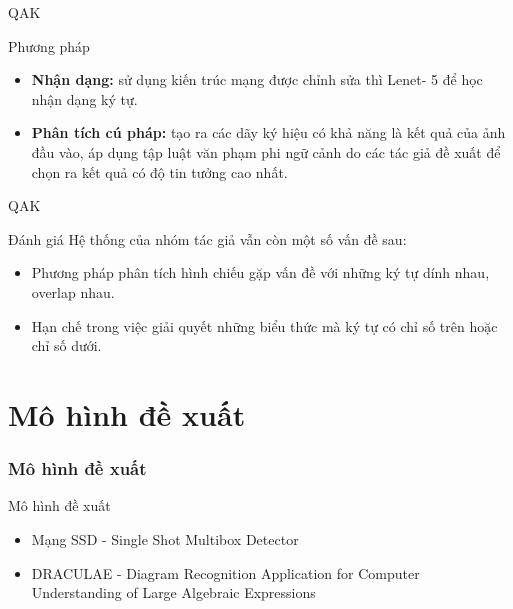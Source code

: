 \documentclass{beamer}
\begin{document}
	\begin{frame}{QAK}
		\begin{block}{Phương pháp}
			\begin{itemize}
				\item \textbf{Nhận dạng:} sử dụng kiến trúc mạng được chỉnh sửa thì Lenet- 5 để học nhận dạng ký tự.
				\item \textbf{Phân tích cú pháp:} tạo ra các dãy ký hiệu có khả năng là kết quả của ảnh đầu vào, áp dụng tập luật văn phạm phi ngữ cảnh do các tác giả đề xuất để chọn ra kết quả có độ tin tưởng cao nhất.
			\end{itemize}
		\end{block}
	\end{frame}
	
	\begin{frame}{QAK}
		\begin{block}{Đánh giá}
			Hệ thống của nhóm tác giả vẫn còn một số vấn đề sau:
			\begin{itemize}
				\item Phương pháp phân tích hình chiếu gặp vấn đề với những ký tự dính nhau, overlap nhau.
				\item Hạn chế trong việc giải quyết những biểu thức mà ký tự có chỉ số trên hoặc chỉ số dưới. 
			\end{itemize}
		\end{block}
	\end{frame}
	
	
	\section{Mô hình đề xuất}
	\begin{frame}
		\frametitle{Mô hình đề xuất}
		{\Huge Mô hình đề xuất}
		\hspace{10 cm}
		
		\begin{itemize}
			\item Mạng SSD - Single Shot Multibox Detector
			\item DRACULAE - Diagram Recognition Application for Computer Understanding of Large Algebraic Expressions
		\end{itemize}
		
		
		
	\end{frame}
	
\end{document}
